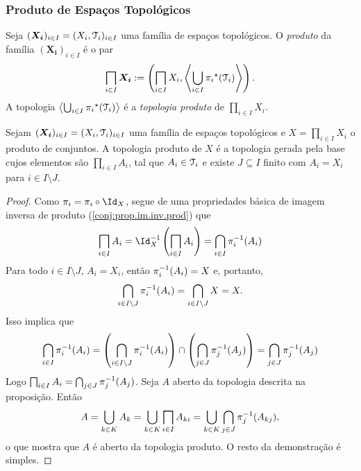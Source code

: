 \subsubsection{Produto de Espaços Topológicos}

\begin{defi}
Seja $(\bm{X_i})_{i \in I} = (X_i,\mathcal{T}_i)_{i \in I}$ uma família de espaços topológicos. O \emph{produto} da família $(\bm{X_i})_{i \in I}$ é o par
	\begin{equation*}
	\prod_{i \in I} \bm{X_i} := \left( \prod_{i \in I} X_i , \ger{\bigcup_{i \in I}{\pi_i}^\star(\topo_i)} \right).
	\end{equation*}
A topologia $\left\langle \bigcup_{i \in I}{\pi_i}^\star(\mathcal{T}_i) \right\rangle$ é a \emph{topologia produto} de $\prod_{i \in I} X_i$.
\end{defi}

\begin{prop}
Sejam $(\bm{X_i})_{i \in I} = (X_i,\mathcal{T}_i)_{i \in I}$ uma família de espaços topológicos e $X = \prod_{i \in I} X_i$ o produto de conjuntos. A topologia produto de $X$ é a topologia gerada pela base cujos elementos são $\prod_{i \in I} A_i$, tal que $A_i \in \mathcal{T}_i$ e existe $J \subseteq I$ finito com $A_i = X_i$ para $i \in I \setminus J$.
\end{prop}
\begin{proof}
Como $\pi_i = \pi_i \circ \Id_X$, segue de uma propriedades básica de imagem inversa de produto (\ref{conj:prop.im.inv.prod}) que
	\begin{equation*}
	\prod_{i \in I} A_i = \Id_X\inv \left(\prod_{i \in I} A_i\right) = \bigcap_{i \in I} \pi_i\inv(A_i)
	\end{equation*}
Para todo $i \in I \setminus J$, $A_i=X_i$, então $\pi_i^{-1}(A_i)=X$ e, portanto,
	\begin{equation*}
	\bigcap_{i \in I\setminus J} \pi_i^{-1}(A_i) = \bigcap_{i \in I\setminus J} X = X.
	\end{equation*}
Isso implica que
	\begin{equation*}
	\bigcap_{i \in I} \pi_i^{-1}(A_i) = \left(\bigcap_{i \in I\setminus J} \pi_i^{-1}(A_i)\right) \cap \left(\bigcap_{j \in J} \pi_j^{-1}(A_j)\right) =  \bigcap_{j \in J} \pi_j^{-1}(A_j)
	\end{equation*}
Logo $\prod_{i \in I} A_i = \bigcap_{j \in J} \pi_j\inv(A_j)$. Seja $A$ aberto da topologia descrita na proposição. Então
	\begin{equation*}
	A = \bigcup_{k \in K} A_k = \bigcup_{k \in K}\prod_{i \in I} A_{ki} = \bigcup_{k \in K}\bigcap_{j \in J} \pi_j\inv (A_{kj}),
	\end{equation*}
o que mostra que $A$ é aberto da topologia produto. O resto da demonstração é simples.
\end{proof}

